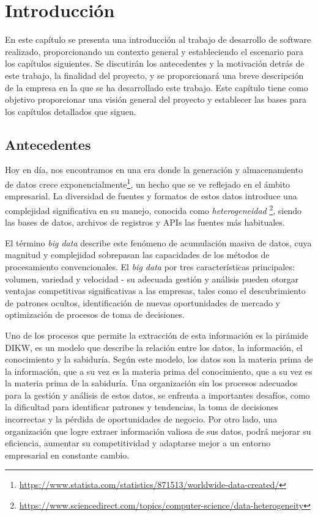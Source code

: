 \chapter{Introducción}\label{chap:intro}
En este capítulo se presenta una introducción al trabajo de desarrollo de software realizado,
proporcionando un contexto general y estableciendo el escenario para los capítulos siguientes.
Se discutirán los antecedentes y la motivación detrás de este trabajo, la finalidad del proyecto,
y se proporcionará una breve descripción de la empresa en la que se ha desarrollado este trabajo.
Este capítulo tiene como objetivo proporcionar una visión general del proyecto y establecer las
bases para los capítulos detallados que siguen.

\section{Antecedentes}\label{sec:antecedentes}
Hoy en día, nos encontramos en una era donde la generación y almacenamiento de datos crece
exponencialmente\footnote{\url{https://www.statista.com/statistics/871513/worldwide-data-created/}},
un hecho que se ve reflejado en el ámbito empresarial. La diversidad de fuentes y formatos de
estos datos introduce una complejidad significativa en su manejo, conocida como \textit{heterogeneidad}
\footnote{\url{https://www.sciencedirect.com/topics/computer-science/data-heterogeneity}}, siendo las
bases de datos, archivos de registros y APIs las fuentes más habituales.

El término \textit{big data} describe este fenómeno de acumulación masiva de datos, cuya magnitud y
complejidad sobrepasan las capacidades de los métodos de procesamiento convencionales. El \textit{big data}
por tres características principales: volumen, variedad y velocidad - su adecuada gestión y análisis
pueden otorgar ventajas competitivas significativas a las empresas, tales como el descubrimiento de
patrones ocultos, identificación de nuevas oportunidades de mercado y optimización de procesos de toma
de decisiones.

Uno de los procesos que permite la extracción de esta información es la pirámide DIKW, \cite{enwiki:1211227190}
es un modelo que describe la relación entre los datos, la información, el conocimiento y la sabiduría.
Según este modelo, los datos son la materia prima de la información, que a su vez es la materia prima
del conocimiento, que a su vez es la materia prima de la sabiduría. Una organización sin los procesos
adecuados para la gestión y análisis de estos datos, se enfrenta a importantes desafíos, como la dificultad
para identificar patrones y tendencias, la toma de decisiones incorrectas y la pérdida de oportunidades de
negocio. Por otro lado, una organización que logre extraer información valiosa de sus datos, podrá mejorar su
eficiencia, aumentar su competitividad y adaptarse mejor a un entorno empresarial en constante cambio.

